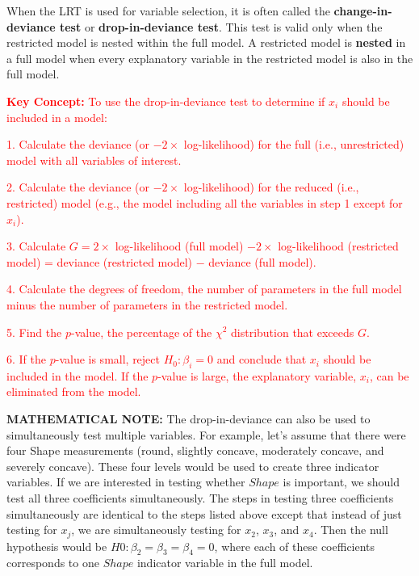 \documentclass[
]{report}
\begin{document}
When the LRT is used for variable selection, it is often called the \textbf{change-in-deviance test} or \textbf{drop-in-deviance test}. This test is valid only when the restricted model is nested within the full model. A
restricted model is \textbf{nested} in a full model when every explanatory variable in the restricted model is also
in the full model.

\Large

\textbf{\textcolor{red}{Key Concept:}}
\textcolor{red}{To use the drop-in-deviance test to determine if $x_i$ should be included in a model:}

\textcolor{red}{1. Calculate the deviance (or $-2 \times$ log-likelihood) for the full (i.e., unrestricted) model with all variables of interest.}

\textcolor{red}{2. Calculate the deviance (or $-2 \times$ log-likelihood) for the reduced (i.e., restricted) model (e.g., the model including all the variables in step 1 except for $x_i$).}

\textcolor{red}{3. Calculate $G = 2 \times$ log-likelihood (full model) $-2 \times$ log-likelihood (restricted model) = deviance (restricted model) $-$ deviance (full model).}

\textcolor{red}{4. Calculate the degrees of freedom, the number of parameters in the full model minus the number of parameters in the restricted model.}

\textcolor{red}{5. Find the $p$-value, the percentage of the $\chi^2$ distribution that exceeds $G$.}

\textcolor{red}{6. If the $p$-value is small, reject $H_0: \beta_i = 0$ and conclude that $x_i$ should be included in the model. If the $p$-value is large, the explanatory variable, $x_i$, can be eliminated from the model.}
\normalsize

\large

\textbf{MATHEMATICAL NOTE:}
The drop-in-deviance can also be used to simultaneously test multiple variables. For example, let's assume
that there were four Shape measurements (round, slightly concave, moderately concave, and severely
concave). These four levels would be used to create three indicator variables. If we are interested in
testing whether \(Shape\) is important, we should test all three coefficients simultaneously. The steps in
testing three coefficients simultaneously are identical to the steps listed above except that instead of
just testing for \(x_j\), we are simultaneously testing for \(x_2\), \(x_3\), and \(x_4\). Then the null hypothesis would be
\(H0: \beta_2 = \beta_3 = \beta_4 = 0\), where each of these coefficients corresponds to one \(Shape\) indicator variable
in the full model.
\normalsize 
\end{document}
